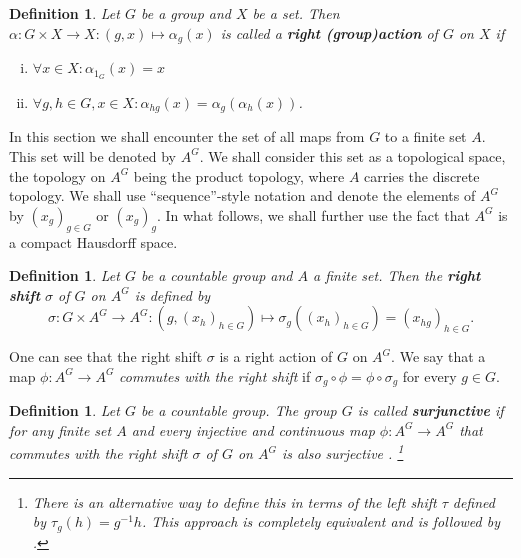 \documentclass[titlepage, a4paper]{article}
\theoremstyle{theoremdd}
\theoremstyle{definitiondd}
\newtheorem{definition}[theorem]{Definition}
\theoremstyle{remarkdd}
\begin{document}
    \begin{definition} %
	    Let $G$ be a group and $X$ be a set. Then $\alpha: G \times X \to X: (g,x) \mapsto \alpha_g(x)$ is called a \textbf{right (group)action} of $G$ on $X$ if
        \begin{enumerate}[(i)]
		\item $\forall x \in X: \alpha_{1_G}(x) = x$
            \item $\forall g,h \in G, x\in X: \alpha_{hg}(x) = \alpha_g(\alpha_h(x))$.
        \end{enumerate}
    \end{definition}

    In this section we shall encounter the set of all maps from $G$ to a finite set $A$. This set will be denoted by $A^G$. We shall consider this set as a topological space, the topology on $A^G$ being the product topology, where $A$ carries the discrete topology. We shall use ``sequence''-style notation and denote the elements of $A^G$ by $(x_g)_{g \in G}$ or $(x_g)_g$. In what follows, we shall further use the fact that $A^G$ is a compact Hausdorff space.

    \begin{definition}
	    Let $G$ be a countable group and $A$ a finite set. Then the \textbf{right shift} $\sigma$ of $G$ on $A^G$ is defined by
        \[
        \sigma: G \times A^G \to A^G: \left(g, (x_{h})_{h \in G} \right) \mapsto \sigma_g((x_{h})_{h \in G}) = \left( x_{hg} \right)_{h \in G}.
        \]
    \end{definition}

    One can see that the right shift $\sigma$ is a right action of $G$ on $A^G$. We say that a map $\phi: A^G \to A^G$ \emph{commutes with the right shift} if $\sigma_g \circ \phi = \phi \circ \sigma_g$ for every $g \in G$.
    
    \begin{definition}
	    Let $G$ be a countable group. The group $G$ is called \textbf{surjunctive} if for any finite set $A$ and every injective and continuous map $\phi: A^{G}\to A^{G}$ that commutes with the right shift $\sigma$ of $G$ on $A^G$ is also surjective \cite[section 1]{weiss_2000} .
	    \footnote{There is an alternative way to define this in terms of the \emph{left shift} $\tau$ defined by $\tau_g(h)= g^{-1}h$. This approach is completely equivalent and is followed by \cite[paragraph 2.13.5 - 2.13.7]{capraro_lupini_2015}.}
    \end{definition}
\end{document}
